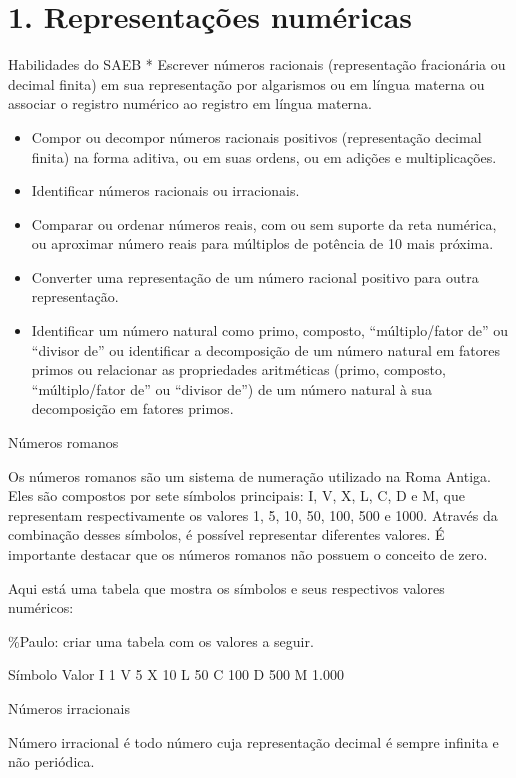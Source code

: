 \hypertarget{representauxe7uxf5es-numuxe9ricas}{%
\section{1. Representações
numéricas}\label{representauxe7uxf5es-numuxe9ricas}}

Habilidades do SAEB * Escrever números racionais (representação
fracionária ou decimal finita) em sua representação por algarismos ou em
língua materna ou associar o registro numérico ao registro em língua
materna.

\begin{itemize}
\item
  Compor ou decompor números racionais positivos (representação decimal
  finita) na forma aditiva, ou em suas ordens, ou em adições e
  multiplicações.
\item
  Identificar números racionais ou irracionais.
\item
  Comparar ou ordenar números reais, com ou sem suporte da reta
  numérica, ou aproximar número reais para múltiplos de potência de 10
  mais próxima.
\item
  Converter uma representação de um número racional positivo para outra
  representação.
\item
  Identificar um número natural como primo, composto, ``múltiplo/fator
  de'' ou ``divisor de'' ou identificar a decomposição de um número
  natural em fatores primos ou relacionar as propriedades aritméticas
  (primo, composto, ``múltiplo/fator de'' ou ``divisor de'') de um
  número natural à sua decomposição em fatores primos.
\end{itemize}

Números romanos

Os números romanos são um sistema de numeração utilizado na Roma Antiga.
Eles são compostos por sete símbolos principais: I, V, X, L, C, D e M,
que representam respectivamente os valores 1, 5, 10, 50, 100, 500 e
1000. Através da combinação desses símbolos, é possível representar
diferentes valores. É importante destacar que os números romanos não
possuem o conceito de zero.

Aqui está uma tabela que mostra os símbolos e seus respectivos valores
numéricos:

\%Paulo: criar uma tabela com os valores a seguir.

Símbolo Valor I 1 V 5 X 10 L 50 C 100 D 500 M 1.000

Números irracionais

Número irracional é todo número cuja representação decimal é sempre
infinita e não periódica.

